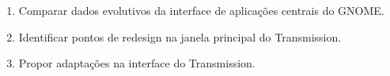 \documentclass[
    12pt,               %
    openright,          %
    oneside,            %
    a4paper,            %
    chapter=TITLE,      %
    section=TITLE,      %
    english,
    brazil              %
]{abntex2}
\begin{document}
\begin{enumerate}
  \item Comparar dados evolutivos da interface de aplicações centrais do GNOME.
  \item Identificar pontos de redesign na janela principal do Transmission.
  \item Propor adaptações na interface do Transmission.
\end{enumerate}











\label{nropaginas}

\printindex
\end{document}
